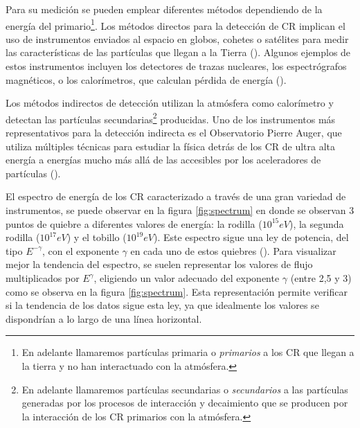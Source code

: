 Para su medición se pueden emplear diferentes métodos dependiendo de la energía del primario\footnote{En adelante llamaremos partículas primaria o \textit{primarios} a los CR que llegan a la tierra y no han interactuado con la atmósfera.}. Los métodos directos para la detección de CR implican el uso de instrumentos enviados al espacio en globos, cohetes o satélites para medir las características de las partículas que llegan a la Tierra (\cite{spurio_2015}). Algunos ejemplos de estos instrumentos incluyen los detectores de trazas nucleares, los espectrógrafos magnéticos, o los calorímetros, que calculan pérdida de energía (\cite{tomassetti_2023}).

Los métodos indirectos de detección utilizan la atmósfera como calorímetro y detectan las partículas secundarias\footnote{En adelante llamaremos partículas secundarias o \textit{secundarios} a las partículas generadas por los procesos de interacción y decaimiento que se producen por la interacción de los CR primarios con la atmósfera.} producidas. Uno de los instrumentos más representativos para la detección indirecta es el Observatorio Pierre Auger, que utiliza múltiples técnicas para estudiar la física detrás de los CR de ultra alta energía a energías mucho más allá de las accesibles por los aceleradores de partículas (\cite{engel_2021}).

El espectro de energía de los CR caracterizado a través de una gran variedad de instrumentos, se puede observar en la figura \ref{fig:spectrum} en donde se observan 3 puntos de quiebre a diferentes valores de energía: la rodilla ($10^{15} eV$), la segunda rodilla ($10^{17}eV$) y el tobillo ($10^{19}eV$). Este espectro sigue una ley de potencia, del tipo $E^{-\gamma}$, con el exponente $\gamma$ en cada uno de estos quiebres (\cite{Riggi_2023}). Para visualizar mejor la tendencia del espectro, se suelen representar los valores de flujo multiplicados por $E^{\gamma}$, eligiendo un valor adecuado del exponente $\gamma$ (entre 2,5 y 3) como se observa en la figura \ref{fig:spectrum}. Esta representación permite verificar si la tendencia de los datos sigue esta ley, ya que idealmente los valores se dispondrían a lo largo de una línea horizontal.

